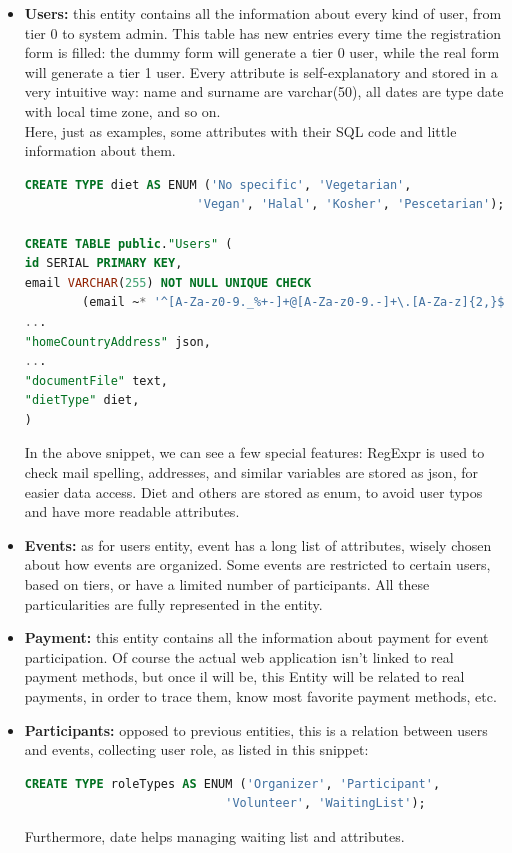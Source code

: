 \begin{itemize}
    \item \textbf{Users:} this entity contains all the information about every kind of user, from
    tier 0 to system admin. This table has new entries every time the registration form is filled: the dummy
    form will generate a tier 0 user, while the real form will generate a tier 1 user. Every attribute 
    is self-explanatory and stored in a very intuitive way: name and surname are varchar(50), all dates
    are type date with local time zone, and so on.\\
    Here, just as examples, some attributes with their SQL code and little information about them.
\begin{lstlisting}[language=SQL]
CREATE TYPE diet AS ENUM ('No specific', 'Vegetarian',
                        'Vegan', 'Halal', 'Kosher', 'Pescetarian');

CREATE TABLE public."Users" (
id SERIAL PRIMARY KEY,
email VARCHAR(255) NOT NULL UNIQUE CHECK 
        (email ~* '^[A-Za-z0-9._%+-]+@[A-Za-z0-9.-]+\.[A-Za-z]{2,}$'),
...
"homeCountryAddress" json,
...
"documentFile" text,
"dietType" diet,
)
\end{lstlisting}
    In the above snippet, we can see a few special features: RegExpr is used to check mail spelling,
    addresses, and similar variables are stored as json, for easier data access. Diet and others
    are stored as enum, to avoid user typos and have more readable attributes.
    \item \textbf{Events:} as for users entity, event has a long list of attributes, wisely chosen
    about how events are organized. Some events are restricted to certain users, based
    on tiers, or have a limited number of participants. All these particularities are fully represented
    in the entity.
    \item \textbf{Payment:} this entity contains all the information about payment for event participation.
    Of course the actual web application isn't linked to real payment methods, but once il will be, this Entity
    will be related to real payments, in order to trace them, know most favorite payment methods, etc.
    \item \textbf{Participants:} opposed to previous entities, this is a relation between users and events,
    collecting user role, as listed in this snippet:
\begin{lstlisting}[language=SQL]
CREATE TYPE roleTypes AS ENUM ('Organizer', 'Participant',
                            'Volunteer', 'WaitingList');
\end{lstlisting}
    Furthermore, date helps managing waiting list and attributes.
\end{itemize}
